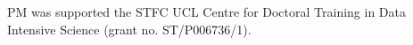 PM was supported the STFC UCL Centre for Doctoral Training in Data Intensive
Science (grant no. ST/P006736/1).
